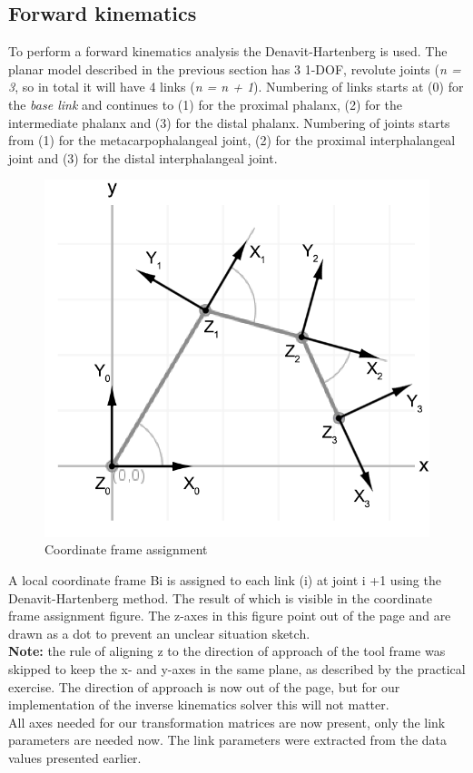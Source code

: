\documentclass{article}
\begin{document}
\subsection{Forward kinematics}

To perform a forward kinematics analysis the Denavit-Hartenberg is used. The planar model described in the previous section has 3 1-DOF, revolute joints (\textit{n = 3}, so in total it will have 4 links (\textit{n = n + 1}). Numbering of links starts at (0) for the \textit{base link} and continues to (1) for the proximal phalanx, (2) for the intermediate phalanx and (3) for the distal phalanx. Numbering of joints starts from (1) for the metacarpophalangeal joint, (2) for the proximal interphalangeal joint and (3) for the distal interphalangeal joint.

\begin{figure}[h!]
\centering
\includegraphics[scale=0.25]{situation3.png}
\caption{Coordinate frame assignment}
\end{figure}

A local coordinate frame Bi is assigned to each link (i) at joint i +1 using the Denavit-Hartenberg method. The result of which is visible in the coordinate frame assignment figure. The z-axes in this figure point out of the page and are drawn as a dot to prevent an unclear situation sketch. \\\textbf{Note:} the rule of aligning z to the direction of approach of the tool frame was skipped to keep the x- and y-axes in the same plane, as described by the practical exercise. The direction of approach is now out of the page, but for our implementation of the inverse kinematics solver this will not matter.  \\All axes needed for our transformation matrices are now present, only the link parameters are needed now. The link parameters were extracted from the data values presented earlier.
\end{document}
